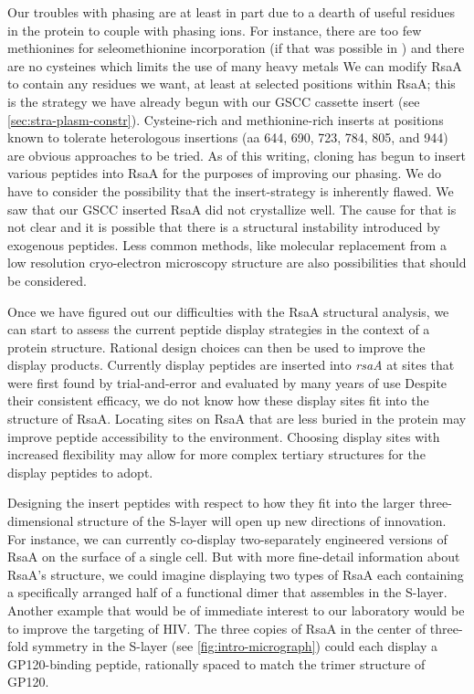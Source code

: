 Our troubles with phasing are at least in part due to a dearth of useful residues in the protein to couple with phasing ions. For instance, there are too few methionines for seleomethionine incorporation (if that was possible in \caulobacter{}) and there are no cysteines which limits the use of many heavy metals We can modify RsaA to contain any residues we want, at least at selected positions within RsaA; this is the strategy we have already begun with our GSCC cassette insert (see \cref{sec:stra-plasm-constr}). Cysteine-rich and methionine-rich inserts at positions known to tolerate heterologous insertions (\eg \ac{aa} 644, 690, 723, 784, 805, and 944) are obvious approaches to be tried. As of this writing, cloning has begun to insert various peptides into RsaA for the purposes of improving our phasing. We do have to consider the possibility that the insert-strategy is inherently flawed. We saw that our GSCC inserted RsaA did not crystallize well. The cause for that is not clear and it is possible that there is a structural instability introduced by exogenous peptides. Less common methods, like molecular replacement from a low resolution cryo-electron microscopy structure are also possibilities that should be considered. 

Once we have figured out our difficulties with the RsaA structural analysis, we can start to assess the
current peptide display strategies in the context of a protein  structure.
Rational design choices can then be used to improve the display products. Currently display peptides are inserted into \textit{rsaA} at sites that were first found by trial-and-error and evaluated by many years of use Despite their consistent efficacy, we do not know how these display sites fit into the structure of RsaA. Locating sites on RsaA that are less buried in the protein may improve peptide accessibility to the environment. Choosing display sites with increased flexibility may allow for more complex tertiary structures for the display peptides to adopt. 

Designing the insert peptides with respect to how they fit into the larger three-dimensional structure of the \ac{S-layer} will open up new directions of innovation. For instance, we can currently co-display two-separately engineered versions of RsaA on the surface of a single \caulobacter cell. But with more fine-detail information about RsaA's structure, we could imagine displaying two types of RsaA each containing  a specifically arranged half of a functional dimer that assembles in the \ac{S-layer}. Another example that would be of immediate interest to our laboratory would be to improve the targeting of HIV. The three copies of RsaA in the center of three-fold symmetry in the \ac{S-layer} (see \cref{fig:intro-micrograph}) could each display a GP120-binding peptide, rationally spaced to match the trimer structure of GP120.


